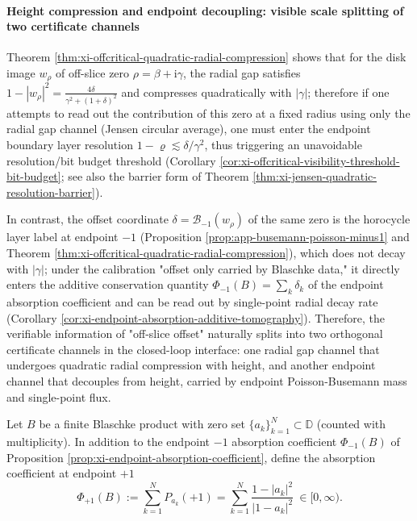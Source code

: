 

\paragraph{Height compression and endpoint decoupling: visible scale splitting of two certificate channels}
Theorem \ref{thm:xi-offcritical-quadratic-radial-compression} shows that for the disk image \(w_\rho\) of off-slice zero \(\rho=\beta+\mathrm{i}\gamma\), the radial gap satisfies
\(
1-|w_\rho|^2=\frac{4\delta}{\gamma^2+(1+\delta)^2}
\)
and compresses quadratically with \(|\gamma|\);
therefore if one attempts to read out the contribution of this zero at a fixed radius using only the radial gap channel (Jensen circular average), one must enter the endpoint boundary layer resolution \(1-\varrho\lesssim \delta/\gamma^2\), thus triggering an unavoidable resolution/bit budget threshold (Corollary \ref{cor:xi-offcritical-visibility-threshold-bit-budget}; see also the barrier form of Theorem \ref{thm:xi-jensen-quadratic-resolution-barrier}).
\par
In contrast, the offset coordinate \(\delta=\mathcal{B}_{-1}(w_\rho)\) of the same zero is the horocycle layer label at endpoint \(-1\) (Proposition \ref{prop:app-busemann-poisson-minus1} and Theorem \ref{thm:xi-offcritical-quadratic-radial-compression}), which does not decay with \(|\gamma|\);
under the calibration "offset only carried by Blaschke data," it directly enters the additive conservation quantity \(\Phi_{-1}(B)=\sum_k \delta_k\) of the endpoint absorption coefficient and can be read out by single-point radial decay rate (Corollary \ref{cor:xi-endpoint-absorption-additive-tomography}).
Therefore, the verifiable information of "off-slice offset" naturally splits into two orthogonal certificate channels in the closed-loop interface: one radial gap channel that undergoes quadratic radial compression with height, and another endpoint channel that decouples from height, carried by endpoint Poisson-Busemann mass and single-point flux.

\begin{definition}\label{def:xi-endpoint-two-absorption-coefficients}
Let \(B\) be a finite Blaschke product with zero set \(\{a_k\}_{k=1}^{N}\subset\mathbb{D}\) (counted with multiplicity).
In addition to the endpoint \(-1\) absorption coefficient \(\Phi_{-1}(B)\) of Proposition \ref{prop:xi-endpoint-absorption-coefficient}, define the absorption coefficient at endpoint \(+1\)
\[
\Phi_{+1}(B):=\sum_{k=1}^{N}P_{a_k}(+1)=\sum_{k=1}^{N}\frac{1-|a_k|^2}{|1-a_k|^2}\ \in[0,\infty).
\]
\end{definition}


